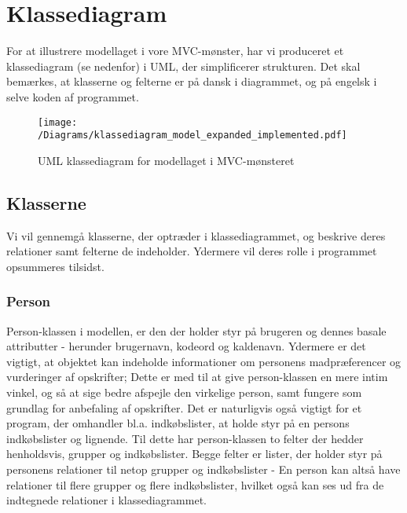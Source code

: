 \chapter{Klassediagram}
For at illustrere modellaget i vore MVC-mønster, har vi produceret et klassediagram (se  nedenfor) i UML, der simplificerer strukturen. 
Det skal bemærkes, at klasserne og felterne er på dansk i diagrammet, og på engelsk i selve koden af programmet.

\begin{figure}[H]
\centering
\texttt{[image: /Diagrams/klassediagram\_model\_expanded\_implemented.pdf]}
\caption{UML klassediagram for modellaget i MVC-mønsteret}\label{diagram:klassediagram}
\end{figure}

\section{Klasserne}
Vi vil gennemgå klasserne, der optræder i klassediagrammet, og beskrive deres relationer samt felterne de indeholder. Ydermere vil deres rolle i programmet opsummeres tilsidst.

\subsection{Person}
Person-klassen i modellen, er den der holder styr på brugeren og dennes basale attributter - herunder brugernavn, kodeord og kaldenavn. 
Ydermere er det vigtigt, at objektet kan indeholde informationer om personens madpræferencer og vurderinger af opskrifter; Dette er med til at give person-klassen en mere intim vinkel, og så at sige bedre afspejle den virkelige person, samt fungere som grundlag for anbefaling af opskrifter. 
Det er naturligvis også vigtigt for et program, der omhandler bl.a. indkøbslister, at holde styr på en persons indkøbslister og lignende. 
Til dette har person-klassen to felter der hedder henholdsvis, grupper og indkøbslister. 
Begge felter er lister, der holder styr på personens relationer til netop grupper og indkøbslister - En person kan altså have relationer til flere grupper og flere indkøbslister, hvilket også kan ses ud fra de indtegnede relationer i klassediagrammet.

